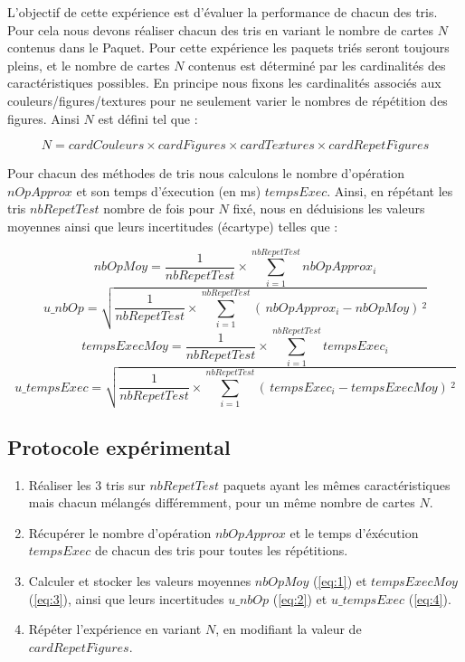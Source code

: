 \documentclass{report}
\begin{document}
L'objectif de cette expérience est d'évaluer la performance de chacun des tris. Pour cela nous devons réaliser chacun des tris en variant le nombre de cartes $N$ contenus dans le Paquet. Pour cette expérience les paquets triés seront toujours pleins, et le nombre de cartes $N$ contenus est déterminé par les cardinalités des caractéristiques possibles. En principe nous fixons les cardinalités associés aux couleurs/figures/textures pour ne seulement varier le nombres de répétition des figures. Ainsi $N$ est défini tel que : 

\begin{equation*}
	N = cardCouleurs \times cardFigures \times cardTextures \times cardRepetFigures
\end{equation*}

\bigskip

\noindent Pour chacun des méthodes de tris nous calculons le nombre d'opération $nOpApprox$ et son temps d'éxecution (en ms) $tempsExec$. Ainsi, en répétant les tris $nbRepetTest$ nombre de fois pour $N$ fixé, nous en déduisions les valeurs moyennes ainsi que leurs incertitudes (écartype) telles que :

\boldmath
\begin{equation} \label{eq:1}
nbOpMoy = \dfrac{1}{nbRepetTest} \times \sum_{i = 1}^{nbRepetTest} nbOpApprox_{i}
\end{equation} 
\begin{equation} \label{eq:2}
	u\_nbOp = \sqrt{\dfrac{1}{nbRepetTest} \times \sum_{i = 1}^{nbRepetTest} (\,nbOpApprox_{i} - nbOpMoy)\,^{2}}
\end{equation} 
\begin{equation} \label{eq:3}
	tempsExecMoy = \dfrac{1}{nbRepetTest} \times \sum_{i = 1}^{nbRepetTest} tempsExec_{i}
\end{equation} 
\begin{equation} \label{eq:4}
	u\_tempsExec = \sqrt{\dfrac{1}{nbRepetTest} \times \sum_{i = 1}^{nbRepetTest} (\,tempsExec_{i} - tempsExecMoy)\,^{2}}
\end{equation} 
\unboldmath

\subsection{Protocole expérimental}

\begin{enumerate}
	\item Réaliser les 3 tris sur $nbRepetTest$ paquets ayant les mêmes caractéristiques mais chacun mélangés différemment, pour un même nombre de cartes $N$.
	\item Récupérer le nombre d'opération $nbOpApprox$ et le temps d'éxécution $tempsExec$ de chacun des tris pour toutes les répétitions.
	\item Calculer et stocker les valeurs moyennes $nbOpMoy$ (\ref{eq:1}) et $tempsExecMoy$ (\ref{eq:3}), ainsi que leurs incertitudes $u\_nbOp$ (\ref{eq:2}) et $u\_tempsExec$ (\ref{eq:4}).
	\item Répéter l'expérience en variant $N$, en modifiant la valeur de $cardRepetFigures$.
\end{enumerate}
\end{document}
